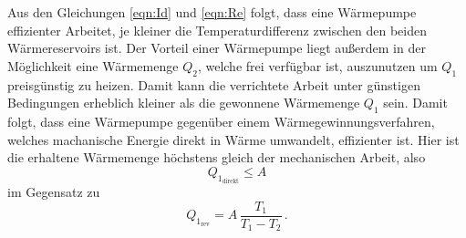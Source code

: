 Aus den Gleichungen \ref{eqn:Id} und \ref{eqn:Re} folgt, dass eine Wärmepumpe effizienter Arbeitet, je kleiner die Temperaturdifferenz
zwischen den beiden Wärmereservoirs ist. Der Vorteil einer Wärmepumpe liegt außerdem in der Möglichkeit eine Wärmemenge $Q_2$, welche frei verfügbar ist, 
auszunutzen um $Q_1$ preisgünstig zu heizen. Damit kann die verrichtete Arbeit unter günstigen Bedingungen erheblich kleiner als die gewonnene Wärmemenge $Q_1$ sein.
Damit folgt, dass eine Wärmepumpe gegenüber einem Wärmegewinnungsverfahren, welches machanische Energie direkt in Wärme umwandelt, effizienter ist.
Hier ist die erhaltene Wärmemenge höchstens gleich der mechanischen Arbeit, also
\begin{equation*}
    Q_{1_\text{direkt}}\leq A
\end{equation*}
im Gegensatz zu
\begin{equation*}
    Q_{1_\text{rev}}=A\,\frac{T_1}{T_1-T_2} \, .
\end{equation*}
